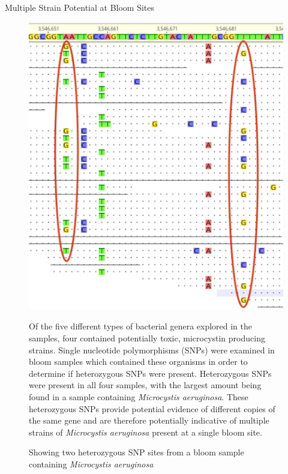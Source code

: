 \documentclass[final]{beamer}
\newlength{\colwidth}
\begin{document}
\begin{frame}[t]
\begin{columns}[t]
\begin{column}{\colwidth}
\begin{block}{Multiple Strain Potential at Bloom Sites}
  \begin{figure}
    \noindent\begin{minipage}{0.3\textwidth}%
    \includegraphics[width=\linewidth]{heterosnps.png}
    \end{minipage}%
    \hfill%
    \begin{minipage}{0.65\textwidth}\raggedright
    Of the five different types of bacterial genera explored in the samples, four contained potentially toxic, microcystin
    producing strains. Single nucleotide polymorphisms (SNPs) were examined in bloom samples which contained these
    organisms in order to determine if heterozygous SNPs were present. Heterozygous SNPs were present in all four samples,
    with the largest amount being found in a sample containing \emph{Microcystis aeruginosa}. These heterozygous SNPs provide potential evidence
    of different copies of the same gene and are therefore potentially indicative of multiple strains of \emph{Microcystis aeruginosa} 
    present at a single bloom site.
    \end{minipage}
    \caption{Showing two heterozygous SNP sites from a bloom sample containing \emph{Microcystis aeruginosa} }
   \end{figure}
  

\end{block}
\end{column}
\end{columns}
\end{frame}
\end{document}
